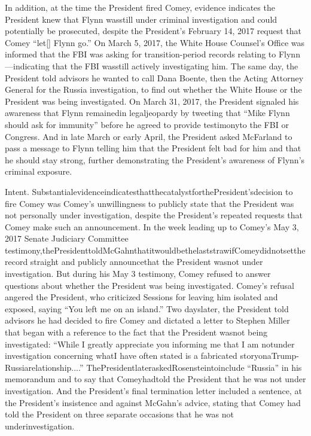 {In addition, at the time the President fired Comey, evidence indicates the President knew that Flynn wasstill under criminal investigation and could potentially be prosecuted, despite the President’s February 14, 2017 request that Comey “let[] Flynn go.” On March 5, 2017, the White House Counsel’s Office was informed that the FBI was asking for transition-period records relating to Flynn—indicating that the FBI wasstill actively investigating him. The same day, the President told advisors he wanted to call Dana Boente, then the Acting Attorney General for the Russia investigation, to find out whether the White House or the President was being investigated. On March 31, 2017, the President signaled his awareness that Flynn remainedin legaljeopardy by tweeting that “Mike Flynn should ask for immunity” before he agreed to provide testimonyto the FBI or Congress. And in late March or early April, the President asked McFarland to pass a message to Flynn telling him that the President felt bad for him and that he should stay strong, further demonstrating the President’s awareness of Flynn’s criminal exposure.

Intent. SubstantialevidenceindicatesthatthecatalystforthePresident’sdecision to fire Comey was Comey’s unwillingness to publicly state that the President was not personally under investigation, despite the President’s repeated requests that Comey make such an announcement. In the week leading up to Comey’s May 3, 2017 Senate Judiciary Committee testimony,thePresidenttoldMcGahnthatitwouldbethelaststrawifComeydidnotsettherecord straight and publicly announcethat the President wasnot under investigation. But during his May 3 testimony, Comey refused to answer questions about whether the President was being investigated. Comey’s refusal angered the President, who criticized Sessions for leaving him isolated and exposed, saying “You left me on an island.” Two dayslater, the President told advisors he had decided to fire Comey and dictated a letter to Stephen Miller that began with a reference to the fact that the President wasnot being investigated: “While I greatly appreciate you
informing me that I am notunder investigation concerning whatI have often stated is a fabricated storyonaTrump-Russiarelationship....” ThePresidentlateraskedRosensteintoinclude “Russia” in his memorandum and to say that Comeyhadtold the President that he was not under investigation. And the President’s final termination letter included a sentence, at the President’s insistence and against McGahn’s advice, stating that Comey had told the President on three separate occasions that he was not underinvestigation.

}
